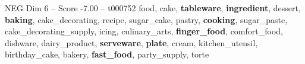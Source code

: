 \begin{textsample}{NEG Dim 6 – Score -7.00 – t000752}  \label{ex:f6_neg_027}
food, cake, \textbf{tableware}, \textbf{ingredient}, dessert, \textbf{baking}, cake\_decorating, recipe, sugar\_cake, pastry, \textbf{cooking}, sugar\_paste, cake\_decorating\_supply, icing, culinary\_arts, \textbf{finger\_food}, comfort\_food, dishware, dairy\_product, \textbf{serveware}, \textbf{plate}, cream, kitchen\_utensil, birthday\_cake, bakery, \textbf{fast\_food}, party\_supply, torte

\end{textsample}

